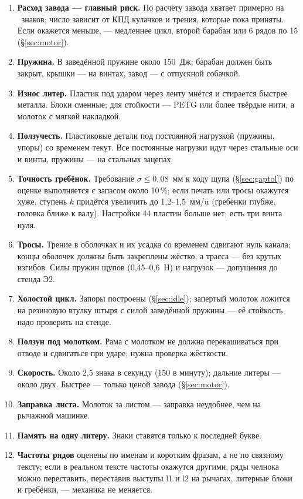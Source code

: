 \begingroup\sloppy
\begin{enumerate}[label=Р\arabic*.]
  \item \textbf{Расход завода — главный риск.} По расчёту завода хватает примерно на \mcharswind\ знаков; число зависит от КПД кулачков и трения, которые пока приняты. Если окажется меньше, — медленнее цикл, второй барабан или 6 рядов по 15 (\S\ref{sec:motor}).
  \item \textbf{Пружина.} В заведённой пружине около 150~Дж; барабан должен быть закрыт, крышки — на винтах, завод — с отпускной собачкой.
  \item \textbf{Износ литер.} Пластик под ударом через ленту мнётся и стирается быстрее металла. Блоки сменные; для стойкости — PETG или более твёрдые нити, а молоток с мягкой накладкой.
  \item \textbf{Ползучесть.} Пластиковые детали под постоянной нагрузкой (пружины, упоры) со временем текут. Все постоянные нагрузки идут через стальные оси и винты, пружины — на стальных зацепах.
  \item \textbf{Точность гребёнок.} Требование $\sigma \le 0{,}08$~мм к ходу щупа (\S\ref{sec:gaptol}) по оценке выполняется с запасом около 10\,\%; если печать или тросы окажутся хуже, ступень $k$ придётся увеличить до 1,2--1,5~мм/u (гребёнки глубже, головка ближе к валу). Настройки 44 пластин больше нет; есть три винта нуля.
  \item \textbf{Тросы.} Трение в оболочках и их усадка со временем сдвигают нуль канала; концы оболочек должны быть закреплены жёстко, а трасса — без крутых изгибов. Силы пружин щупов (0,45--0,6~Н) и нагрузок — допущения до стенда Э2.
  \item \textbf{Холостой цикл.} Запоры построены (\S\ref{sec:idle}); запертый молоток ложится на резиновую втулку штыря с силой заведённой пружины — её стойкость надо проверить на стенде.
  \item \textbf{Ползун под молотком.} Рама с молотком не должна перекашиваться при отводе и сдвигаться при ударе; нужна проверка жёсткости.
  \item \textbf{Скорость.} Около 2,5 знака в секунду (150 в минуту); дальние литеры — около двух. Быстрее — только ценой завода (\S\ref{sec:motor}).
  \item \textbf{Заправка листа.} Молоток за листом — заправка неудобнее, чем на рычажной машинке.
  \item \textbf{Память на одну литеру.} Знаки ставятся только к последней букве.
  \item \textbf{Частоты рядов} оценены по именам и коротким фразам, а не по связному тексту; если в реальном тексте частоты окажутся другими, ряды челнока можно переставить, переставив выступы l1 и l2 на рычагах, литерные блоки и гребёнки, — механика не меняется.

\end{enumerate}
